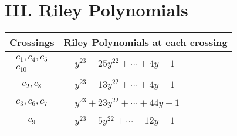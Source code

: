 \documentclass[1p]{elsarticle_modified}
\theoremstyle{definition}
\begin{document}
\centering \section*{ III. Riley Polynomials}
\begin{tabular}{m{50pt}|m{274pt}}
Crossings & \hspace{64pt}Riley Polynomials at each crossing \\
\hline $$\begin{aligned}c_{1},c_{4},c_{5}\\c_{10}\end{aligned}$$&$\begin{aligned}
&y^{23}-25 y^{22}+\cdots+4 y-1
\end{aligned}$\\
\hline $$\begin{aligned}c_{2},c_{8}\end{aligned}$$&$\begin{aligned}
&y^{23}-13 y^{22}+\cdots+4 y-1
\end{aligned}$\\
\hline $$\begin{aligned}c_{3},c_{6},c_{7}\end{aligned}$$&$\begin{aligned}
&y^{23}+23 y^{22}+\cdots+44 y-1
\end{aligned}$\\
\hline $$\begin{aligned}c_{9}\end{aligned}$$&$\begin{aligned}
&y^{23}-5 y^{22}+\cdots-12 y-1
\end{aligned}$\\
\hline
\end{tabular}
\vskip 2pc
\end{document}
